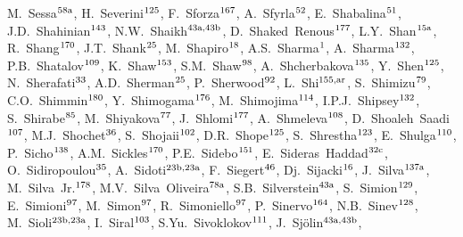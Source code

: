 \begin{flushleft}
M.~Sessa$^\textrm{\scriptsize 58a}$,    
H.~Severini$^\textrm{\scriptsize 125}$,    
F.~Sforza$^\textrm{\scriptsize 167}$,    
A.~Sfyrla$^\textrm{\scriptsize 52}$,    
E.~Shabalina$^\textrm{\scriptsize 51}$,    
J.D.~Shahinian$^\textrm{\scriptsize 143}$,    
N.W.~Shaikh$^\textrm{\scriptsize 43a,43b}$,    
D.~Shaked~Renous$^\textrm{\scriptsize 177}$,    
L.Y.~Shan$^\textrm{\scriptsize 15a}$,    
R.~Shang$^\textrm{\scriptsize 170}$,    
J.T.~Shank$^\textrm{\scriptsize 25}$,    
M.~Shapiro$^\textrm{\scriptsize 18}$,    
A.S.~Sharma$^\textrm{\scriptsize 1}$,    
A.~Sharma$^\textrm{\scriptsize 132}$,    
P.B.~Shatalov$^\textrm{\scriptsize 109}$,    
K.~Shaw$^\textrm{\scriptsize 153}$,    
S.M.~Shaw$^\textrm{\scriptsize 98}$,    
A.~Shcherbakova$^\textrm{\scriptsize 135}$,    
Y.~Shen$^\textrm{\scriptsize 125}$,    
N.~Sherafati$^\textrm{\scriptsize 33}$,    
A.D.~Sherman$^\textrm{\scriptsize 25}$,    
P.~Sherwood$^\textrm{\scriptsize 92}$,    
L.~Shi$^\textrm{\scriptsize 155,ar}$,    
S.~Shimizu$^\textrm{\scriptsize 79}$,    
C.O.~Shimmin$^\textrm{\scriptsize 180}$,    
Y.~Shimogama$^\textrm{\scriptsize 176}$,    
M.~Shimojima$^\textrm{\scriptsize 114}$,    
I.P.J.~Shipsey$^\textrm{\scriptsize 132}$,    
S.~Shirabe$^\textrm{\scriptsize 85}$,    
M.~Shiyakova$^\textrm{\scriptsize 77}$,    
J.~Shlomi$^\textrm{\scriptsize 177}$,    
A.~Shmeleva$^\textrm{\scriptsize 108}$,    
D.~Shoaleh~Saadi$^\textrm{\scriptsize 107}$,    
M.J.~Shochet$^\textrm{\scriptsize 36}$,    
S.~Shojaii$^\textrm{\scriptsize 102}$,    
D.R.~Shope$^\textrm{\scriptsize 125}$,    
S.~Shrestha$^\textrm{\scriptsize 123}$,    
E.~Shulga$^\textrm{\scriptsize 110}$,    
P.~Sicho$^\textrm{\scriptsize 138}$,    
A.M.~Sickles$^\textrm{\scriptsize 170}$,    
P.E.~Sidebo$^\textrm{\scriptsize 151}$,    
E.~Sideras~Haddad$^\textrm{\scriptsize 32c}$,    
O.~Sidiropoulou$^\textrm{\scriptsize 35}$,    
A.~Sidoti$^\textrm{\scriptsize 23b,23a}$,    
F.~Siegert$^\textrm{\scriptsize 46}$,    
Dj.~Sijacki$^\textrm{\scriptsize 16}$,    
J.~Silva$^\textrm{\scriptsize 137a}$,    
M.~Silva~Jr.$^\textrm{\scriptsize 178}$,    
M.V.~Silva~Oliveira$^\textrm{\scriptsize 78a}$,    
S.B.~Silverstein$^\textrm{\scriptsize 43a}$,    
S.~Simion$^\textrm{\scriptsize 129}$,    
E.~Simioni$^\textrm{\scriptsize 97}$,    
M.~Simon$^\textrm{\scriptsize 97}$,    
R.~Simoniello$^\textrm{\scriptsize 97}$,    
P.~Sinervo$^\textrm{\scriptsize 164}$,    
N.B.~Sinev$^\textrm{\scriptsize 128}$,    
M.~Sioli$^\textrm{\scriptsize 23b,23a}$,    
I.~Siral$^\textrm{\scriptsize 103}$,    
S.Yu.~Sivoklokov$^\textrm{\scriptsize 111}$,    
J.~Sj\"{o}lin$^\textrm{\scriptsize 43a,43b}$,    

\end{flushleft}
